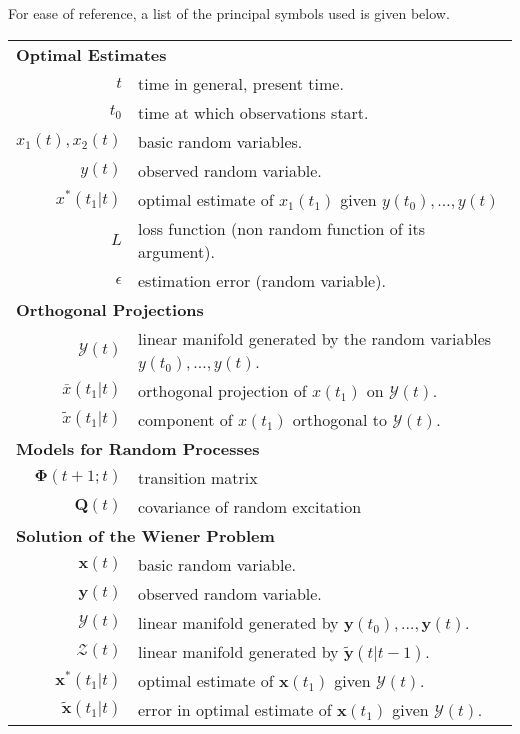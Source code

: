 \documentclass{article}
\begin{document}
For ease of reference, a list of the principal symbols used is given below.
\begin{table}[htbp]
\centering
\begin{tabular}{rl}
\multicolumn{2}{l}{\textbf{Optimal Estimates}}\\
$t$ & time in general, present time.\\
$t_0$ & time at which observations start.\\
$x_1(t),x_2(t)$ & basic random variables.\\
$y(t)$ & observed random variable.\\
$x^\ast (t_1 \vert t)$ & optimal estimate of $x_1(t_1)$ given $y(t_0), \dotsc, y(t)$\\
$L$ & loss function (non random function of its argument).\\
$\epsilon$ & estimation error (random variable).\\
\multicolumn{2}{l}{\textbf{Orthogonal Projections}}\\
$\mathbf{\mathcal{Y}}(t)$ & linear manifold generated by the random variables $y(t_0), \dotsc, y(t)$.\\
$\bar{x}(t_1 \vert t)$ & orthogonal projection of $x(t_1)$ on $\mathbf{\mathcal{Y}}(t)$.\\
$\tilde{x}(t_1 \vert t)$ & component of $x(t_1)$ orthogonal to $\mathbf{\mathcal{Y}}(t)$.\\
\multicolumn{2}{l}{\textbf{Models for Random Processes}}\\
$\boldsymbol{\Phi}(t+1 ; t)$ & transition matrix\\
$\mathbf{Q}(t)$ & covariance of random excitation\\
\multicolumn{2}{l}{\textbf{Solution of the Wiener Problem}}\\
$\mathbf{x}(t)$ & basic random variable.\\
$\mathbf{y}(t)$ & observed random variable.\\
$\mathbf{\mathcal{Y}}(t)$ & linear manifold generated by $\mathbf{y}(t_0), \dotsc, \mathbf{y}(t)$.\\
$\mathbf{\mathcal{Z}}(t)$ & linear manifold generated by $\tilde{\mathbf{y}}(t \vert t-1)$.\\
$\mathbf{x}^\ast(t_1 \vert t)$ & optimal estimate of $\mathbf{x}(t_1)$ given $\mathbf{\mathcal{Y}}(t)$.\\
$\tilde{\mathbf{x}}(t_1 \vert t)$ & error in optimal estimate of $\mathbf{x}(t_1)$ given $\mathbf{\mathcal{Y}}(t)$.
\end{tabular}
\end{table}
\end{document}

